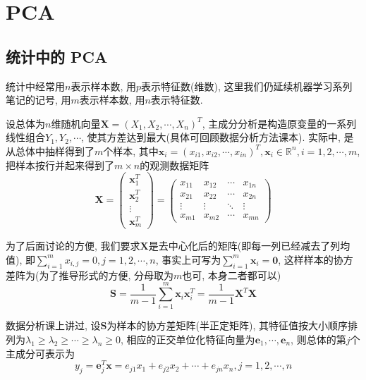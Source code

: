 \documentclass[a4paper,UTF8]{ctexart}
\theoremstyle{plain} \newtheorem{theorem}{定理}[section]
\theoremstyle{plain} \newtheorem{definition}{定义}[section]
\theoremstyle{plain} \newtheorem{lemma}{引理}[section]
\theoremstyle{plain} \newtheorem{proposition}{命题}[section]
\theoremstyle{plain} \newtheorem{example}{例}[section]
\theoremstyle{plain} \newtheorem{remark}{注}[section]
\theoremstyle{plain} \newtheorem{corollary}{推论}[section]
\begin{document}
\section{PCA}
\subsection{统计中的 PCA}
统计中经常用$n$表示样本数, 用$p$表示特征数(维数), 这里我们仍延续机器学习系列笔记的记号, 用$m$表示样本数, 用$n$表示特征数.

设总体为$n$维随机向量$\bm{X} = (X_1, X_2, \cdots, X_n)^{T}$, 主成分分析是构造原变量的一系列线性组合$Y_1, Y_2, \cdots$, 使其方差达到最大(具体可回顾数据分析方法课本). 实际中, 是从总体中抽样得到了$m$个样本, 其中$\bm{x}_{i} = (x_{i1}, x_{i2}, \cdots, x_{in})^{T}, \bm{x}_i \in \mathbb{R}^{n}, i = 1, 2, \cdots, m$, 把样本按行并起来得到了$m \times n$的观测数据矩阵
$$
\bm{X} = 
\begin{pmatrix}
\bm{x}_{1}^{T} \\ 
\bm{x}_{2}^{T} \\ 
\vdots \\ 
\bm{x}_{m}^{T}
\end{pmatrix}
= 
\begin{pmatrix}
x_{11}  &  x_{12}  &  \cdots  &  x_{1n} \\ 
x_{21}  &  x_{22}  &  \cdots  &  x_{2n} \\ 
\vdots  &  \vdots  &  \ddots  &  \vdots \\ 
x_{m1}  &  x_{m2}  &  \cdots  &  x_{mn}
\end{pmatrix}
$$

为了后面讨论的方便, 我们要求$\bm{X}$是去中心化后的矩阵(即每一列已经减去了列均值), 即$\sum_{i = 1}^{m} x_{i, j} = 0, j = 1, 2, \cdots, n$, 事实上可写为$\sum_{i = 1}^{m} \bm{x}_i = \bm{0}$, 这样样本的协方差阵为(为了推导形式的方便, 分母取为$m$也可, 本身二者都可以)
\begin{equation*}
\bm{S} = \frac{1}{m - 1} \sum_{i=1}^{m} \bm{x}_i \bm{x}_{i}^{T} = \frac{1}{m - 1} \bm{X}^{T} \bm{X}
\end{equation*}

数据分析课上讲过, 设$\bm{S}$为样本的协方差矩阵(半正定矩阵), 其特征值按大小顺序排列为$\lambda_1 \geqslant \lambda_2 \geqslant \cdots \geqslant \lambda_n \geqslant 0$, 相应的正交单位化特征向量为$\bm{e}_1, \cdots, \bm{e}_n$, 则总体的第$j$个主成分可表示为
\begin{equation*}
y_{j} = \bm{e}_{j}^{T} \bm{x} = e_{j1} x_1 + e_{j2} x_2 + \cdots + e_{jn} x_n, j = 1, 2, \cdots, n
\end{equation*}
\end{document}
